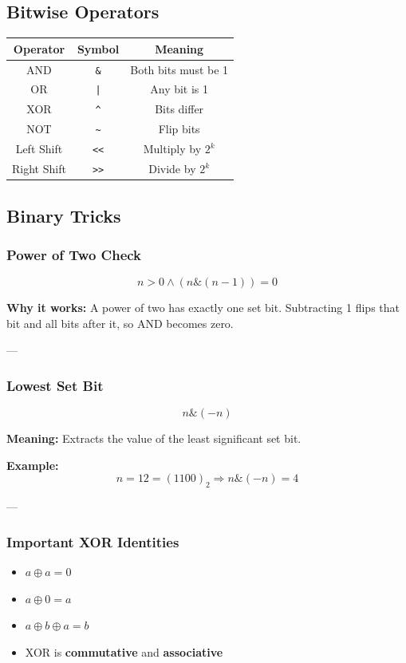 \documentclass[11pt]{article}
\begin{document}
\subsection{Bitwise Operators}

\begin{center}
\begin{tabular}{ccc}
\toprule
Operator & Symbol & Meaning \\
\midrule
AND & \texttt{\&} & Both bits must be 1 \\
OR & \texttt{|} & Any bit is 1 \\
XOR & \texttt{\^} & Bits differ \\
NOT & \texttt{\~} & Flip bits \\
Left Shift & \texttt{<<} & Multiply by $2^k$ \\
Right Shift & \texttt{>>} & Divide by $2^k$ \\
\bottomrule
\end{tabular}
\end{center}

\subsection{Binary Tricks}

\subsubsection{Power of Two Check}
\[
n > 0 \land (n \& (n-1)) = 0
\]

\textbf{Why it works:}  
A power of two has exactly one set bit. Subtracting 1 flips that bit and all bits after it, so AND becomes zero.

---

\subsubsection{Lowest Set Bit}
\[
n \& (-n)
\]

\textbf{Meaning:}  
Extracts the value of the least significant set bit.

\textbf{Example:}
\[
n = 12 = (1100)_2 \Rightarrow n \& (-n) = 4
\]

---

\subsubsection{Important XOR Identities}

\begin{itemize}
    \item $a \oplus a = 0$
    \item $a \oplus 0 = a$
    \item $a \oplus b \oplus a = b$
    \item XOR is \textbf{commutative} and \textbf{associative}
\end{itemize}
\end{document}
